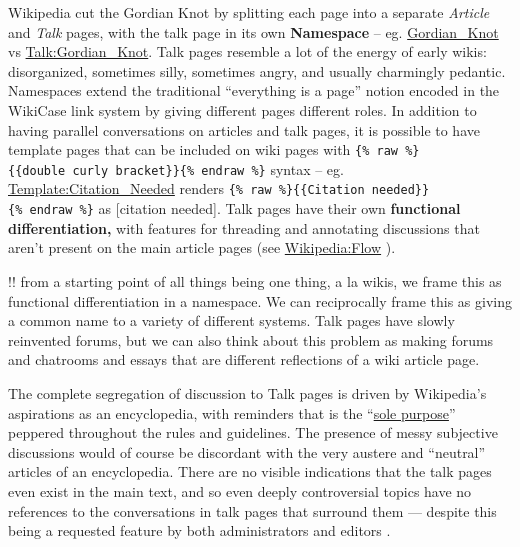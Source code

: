 \documentclass[10pt]{tufte-book}
\begin{document}
Wikipedia cut the Gordian Knot by splitting each page into a separate
\emph{Article} and \emph{Talk} pages, with the talk page in its own
\textbf{Namespace} -- eg.
\href{https://en.wikipedia.org/wiki/Gordian_Knot}{Gordian\_Knot} vs
\href{https://en.wikipedia.org/wiki/Talk:Gordian_Knot}{Talk:Gordian\_Knot}.
Talk pages resemble a lot of the energy of early wikis: disorganized,
sometimes silly, sometimes angry, and usually charmingly pedantic.
Namespaces extend the traditional ``everything is a page'' notion
encoded in the WikiCase link system by giving different pages different
roles. In addition to having parallel conversations on articles and talk
pages, it is possible to have template pages that can be included on
wiki pages with
\texttt{\{\%\ raw\ \%\}\{\{double\ curly\ bracket\}\}\{\%\ endraw\ \%\}}
syntax -- eg.
\href{https://en.wikipedia.org/wiki/Template:Citation_needed}{Template:Citation\_Needed}
renders
\texttt{\{\%\ raw\ \%\}\{\{Citation\ needed\}\}\{\%\ endraw\ \%\}} as
{[}citation needed{]}. Talk pages have their own \textbf{functional
differentiation,} with features for threading and annotating discussions
that aren't present on the main article pages (see
\href{https://en.wikipedia.org/wiki/Wikipedia:Flow}{Wikipedia:Flow} \citep{WikipediaFlow2021} ).

!! from a starting point of all things being one thing, a la wikis, we
frame this as functional differentiation in a namespace. We can
reciprocally frame this as giving a common name to a variety of
different systems. Talk pages have slowly reinvented forums, but we can
also think about this problem as making forums and chatrooms and essays
that are different reflections of a wiki article page.

The complete segregation of discussion to Talk pages is driven by
Wikipedia's aspirations as an encyclopedia, with reminders that is the
``\href{https://en.wikipedia.org/wiki/Wikipedia:Don't_lose_the_thread\#Move_to_the_article_talk_page}{sole
purpose}'' peppered throughout the rules and guidelines. The presence of
messy subjective discussions would of course be discordant with the very
austere and ``neutral'' articles of an encyclopedia. There are no
visible indications that the talk pages even exist in the main text, and
so even deeply controversial topics have no references to the
conversations in talk pages that surround them --- despite this being a
requested feature by both administrators and editors \citep{schneiderUnderstandingImprovingWikipedia2011} .
\end{document}
